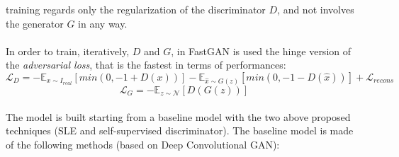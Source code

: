 \documentclass[12pt]{article}
\begin{document}
training regards only the regularization of the discriminator $D$, and not involves the generator $G$ in any way.\\\\
In order to train, iteratively, $D$ and $G$, in FastGAN is used the hinge version of the \textit{adversarial loss}, that is the fastest in terms
of performances:
\begin{equation}
	\mathcal{L}_D = - \mathbb{E}_{x \sim I_{real}}[min(0, -1 + D(x))] - \mathbb{E}_{\hat{x} \sim G(z)}[min(0,-1 - D(\hat{x}))] + \mathcal{L}_{recons}
\end{equation}
\begin{equation}
	\mathcal{L}_G = - \mathbb{E}_{z \sim \mathcal{N}}[D(G(z))]
\end{equation}\\
The model is built starting from a baseline model with the two above proposed techniques (SLE and self-supervised discriminator).
The baseline model is made of the following methods (based on Deep Convolutional GAN):
\end{document}
